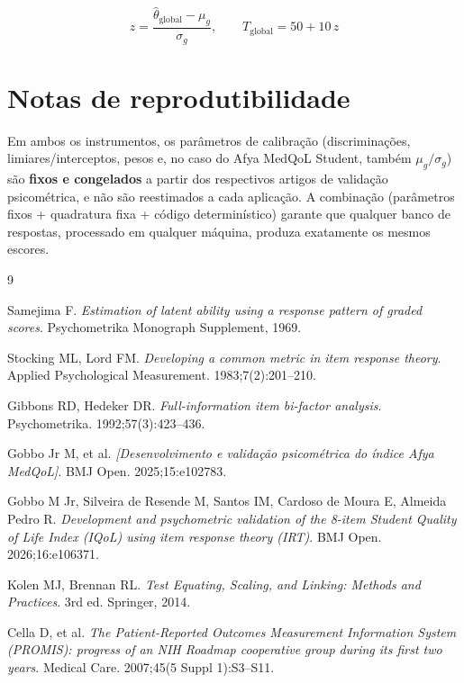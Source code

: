 \documentclass[12pt,a4paper]{article}
\begin{document}
\begin{equation}
z = \frac{\hat\theta_{\text{global}} - \mu_g}{\sigma_g}, \qquad
T_{\text{global}} = 50 + 10\,z
\label{eq:iqol-tscore}
\end{equation}

\section{Notas de reprodutibilidade}

Em ambos os instrumentos, os parâmetros de calibração (discriminações,
limiares/interceptos, pesos e, no caso do Afya MedQoL Student, também $\mu_g/\sigma_g$) são
\textbf{fixos e congelados} a partir dos respectivos artigos de validação
psicométrica, e não são reestimados a cada aplicação.
A combinação (parâmetros fixos + quadratura fixa + código determinístico)
garante que qualquer banco de respostas, processado em qualquer máquina,
produza exatamente os mesmos escores.

\begin{thebibliography}{9}

Samejima F.
\emph{Estimation of latent ability using a response pattern of graded scores}.
Psychometrika Monograph Supplement, 1969.

Stocking ML, Lord FM.
\emph{Developing a common metric in item response theory}.
Applied Psychological Measurement. 1983;7(2):201--210.

Gibbons RD, Hedeker DR.
\emph{Full-information item bi-factor analysis}.
Psychometrika. 1992;57(3):423--436.

Gobbo Jr M, et al.
\emph{[Desenvolvimento e validação psicométrica do índice Afya MedQoL]}.
BMJ Open. 2025;15:e102783.

Gobbo M Jr, Silveira de Resende M, Santos IM, Cardoso de Moura E, Almeida Pedro R.
\emph{Development and psychometric validation of the 8-item Student Quality
of Life Index (IQoL) using item response theory (IRT)}.
BMJ Open. 2026;16:e106371.

Kolen MJ, Brennan RL.
\emph{Test Equating, Scaling, and Linking: Methods and Practices}. 3rd ed.
Springer, 2014.

Cella D, et al.
\emph{The Patient-Reported Outcomes Measurement Information System (PROMIS):
progress of an NIH Roadmap cooperative group during its first two years}.
Medical Care. 2007;45(5 Suppl 1):S3--S11.

\end{thebibliography}
\end{document}
